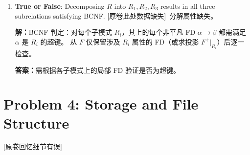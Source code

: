 \documentclass[11pt,a4paper]{article}
\newcommand{\solution}{\par\noindent\textcolor{ansblue}{\textbf{解：}}}
\newcommand{\answer}{\par\noindent\textcolor{ansred}{\textbf{答案：}}}
\newcommand{\missingnote}{\textcolor{ansred}{[原卷此处数据缺失]}}
\newcommand{\recallnote}{\textcolor{ansred}{[原卷回忆细节有误]}}
\begin{document}
\begin{enumerate}[leftmargin=*,itemsep=6pt]
  \answer 需计算 $(R_1 \cap R_2)^+_F$，检查是否包含 $R_1$ 或 $R_2$。

\item \textbf{True or False}: Decomposing $R$ into $R_1,R_2,R_3$ results in all
  three subrelations satisfying BCNF. \missingnote\  分解属性缺失。

  \solution BCNF 判定：对每个子模式 $R_i$，其上的每个非平凡 FD
  $\alpha \to \beta$ 都需满足 $\alpha$ 是 $R_i$ 的超键。
  从 $F$ 仅保留涉及 $R_i$ 属性的 FD（或求投影 $F^+|_{R_i}$）后逐一检查。

  \answer 需根据各子模式上的局部 FD 验证是否为超键。

\end{enumerate}

\section*{Problem 4: Storage and File Structure}

\recallnote
\end{document}
